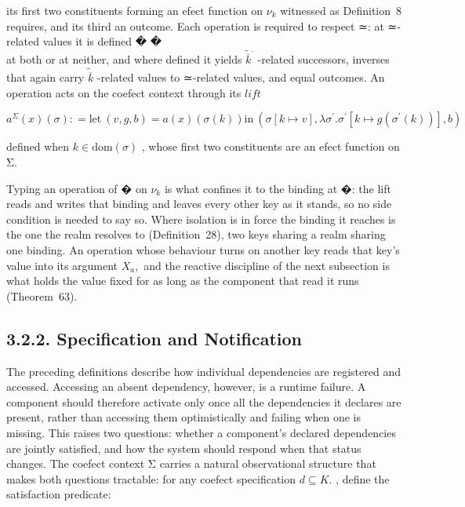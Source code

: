 \documentclass[
  10
]{article}
\begin{document}
its first two constituents forming an efect function on \(\nu _ { k }\)
witnessed as Definition~8 requires, and its third an outcome. Each
operation is required to respect ≃: at ≃-related values it is defined �
�\\
at both or at neither, and where defined it yields
\({ \widetilde { \overline { { k } } } } ^ { . }\) -related successors,
inverses that again carry \(\widetilde { \overline { { k } } }\)
-related values to ≃-related values, and equal outcomes. An operation
acts on the coefect context through its \(l i f t\)

\[
a ^ { \Sigma } ( x ) ( \sigma ) : = \mathrm { { l e t } } \ ( v , g , b ) = a ( x ) ( \sigma ( k ) ) \mathrm { { i n } } \ ( \sigma [ k \mapsto v ] , \lambda \sigma ^ { \prime } . \sigma ^ { \prime } [ k \mapsto g ( \sigma ^ { \prime } ( k ) ) ] , b )\tag{23}
\]

defined when \(k \in \mathrm { d o m } ( \sigma )\) , whose first two
constituents are an efect function on Σ.

Typing an operation of � on \(\nu _ { k }\) is what confines it to the
binding at �: the lift reads and writes that binding and leaves every
other key as it stands, so no side condition is needed to say so. Where
isolation is in force the binding it reaches is the one the realm
resolves to (Definition~28), two keys sharing a realm sharing one
binding. An operation whose behaviour turns on another key reads that
key's value into its argument \(X _ { a } ,\) and the reactive
discipline of the next subsection is what holds the value fixed for as
long as the component that read it runs (Theorem~63).

\subsection{3.2.2. Specification and
Notification}\label{specification-and-notification}

The preceding definitions describe how individual dependencies are
registered and accessed. Accessing an absent dependency, however, is a
runtime failure. A component should therefore activate only once all the
dependencies it declares are present, rather than accessing them
optimistically and failing when one is missing. This raises two
questions: whether a component's declared dependencies are jointly
satisfied, and how the system should respond when that status changes.
The coefect context Σ carries a natural observational structure that
makes both questions tractable: for any coefect specification
\(d \subseteq K .\) , define the satisfaction predicate:
\end{document}
